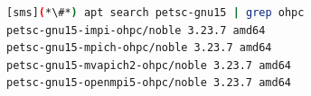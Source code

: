 \begin{lstlisting}[language=bash,keywords={}]
[sms](*\#*) apt search petsc-gnu15 | grep ohpc
petsc-gnu15-impi-ohpc/noble 3.23.7 amd64
petsc-gnu15-mpich-ohpc/noble 3.23.7 amd64
petsc-gnu15-mvapich2-ohpc/noble 3.23.7 amd64
petsc-gnu15-openmpi5-ohpc/noble 3.23.7 amd64
\end{lstlisting}
